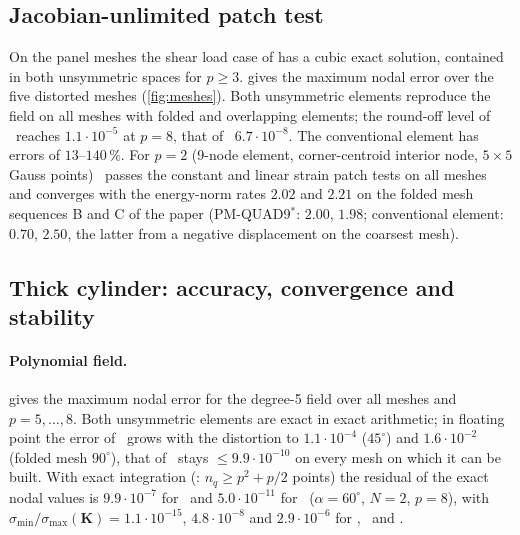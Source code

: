 \subsection{Jacobian-unlimited patch test}\label{sec:num-panel}
On the panel meshes the shear load case of \citet{Rajendran2010technique} has a cubic exact
solution, contained in both unsymmetric spaces for $p\ge3$.  gives the maximum
nodal error over the five distorted meshes (\cref{fig:meshes}). Both unsymmetric elements
reproduce the field on all meshes with folded and overlapping elements; the round-off level of
\PM\ reaches $1.1\cdot10^{-5}$ at $p=8$, that of \PH\ $6.7\cdot10^{-8}$. The conventional element has
errors of $13$--$140\,\%$. For $p=2$ (9-node element, corner-centroid interior node, $5\times5$ Gauss
points) \PH\ passes the constant and linear strain patch tests on all meshes and converges with
the energy-norm rates $2.02$ and $2.21$ on the folded mesh sequences B and C of the paper (PM-QUAD9$^\ast$:
$2.00$, $1.98$; conventional element: $0.70$, $2.50$, the latter from a negative displacement on
the coarsest mesh).

\begin{table}[t]
  \centering\small
  \caption{Jacobian-unlimited patch test (cubic field), maximum relative nodal error over the
    panel meshes with $\theta=90^\circ,\dots,270^\circ$.}
  \label{tab:panel}
  
\end{table}

\subsection{Thick cylinder: accuracy, convergence and stability}\label{sec:cylinder}
\paragraph{Polynomial field.}  gives the maximum nodal error for the degree-5
field over all meshes and $p=5,\dots,8$. Both unsymmetric elements are exact in exact arithmetic;
in floating point the error of \PM\ grows with the distortion to $1.1\cdot10^{-4}$ ($45^\circ$) and
$1.6\cdot10^{-2}$ (folded mesh $90^\circ$), that of \PH\ stays $\le9.9\cdot10^{-10}$ on every mesh on which
it can be built. With exact integration (\PM: $n_q\ge p^2+p/2$ points) the residual of the exact
nodal values is $9.9\cdot10^{-7}$ for \PM\ and $5.0\cdot10^{-11}$ for \PH\ ($\alpha=60^\circ$, $N=2$,
$p=8$), with $\sigma_{\min}/\sigma_{\max}(\bm K)=1.1\cdot10^{-15}$, $4.8\cdot10^{-8}$ and $2.9\cdot10^{-6}$ for
\PM, \PH\ and \PP.

